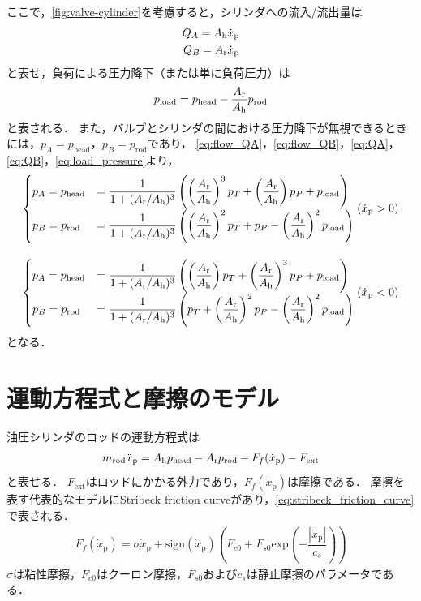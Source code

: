 ここで，\figname\ref{fig:valve-cylinder}を考慮すると，シリンダへの流入/流出量は
\begin{align}
    \label{eq:QA}
    Q_A = A_\mathrm{h} \dot{x}_\mathrm{p}\\
    \label{eq:QB}
    Q_B = A_\mathrm{r} \dot{x}_\mathrm{p}
\end{align}
と表せ，負荷による圧力降下（または単に負荷圧力）は
\begin{align}
    \label{eq:load_pressure}
    p_\mathrm{load} = p_\mathrm{head} - \frac{A_\mathrm{r}}{A_\mathrm{h}}p_\mathrm{rod}
\end{align}
と表される．
また，バルブとシリンダの間における圧力降下が無視できるときには，$p_A = p_\mathrm{head}$，$p_B = p_\mathrm{rod}$であり，
\eqnname\ref{eq:flow_QA}，\eqnname\ref{eq:flow_QB}，\eqnname\ref{eq:QA}，\eqnname\ref{eq:QB}，\eqnname\ref{eq:load_pressure}より，
\begin{align}
    \label{eq:papb-xp_plus}
    \begin{cases}
    p_A = p_\mathrm{head} &= \dfrac{1}{1+(A_\mathrm{r}/A_\mathrm{h})^3}\left( \left(\dfrac{A_\mathrm{r}}{A_\mathrm{h}}\right)^3p_T + \left(\dfrac{A_\mathrm{r}}{A_\mathrm{h}}\right)p_P  + p_\mathrm{load}\right) \\
    p_B = p_\mathrm{rod} &= \dfrac{1}{1+(A_\mathrm{r}/A_\mathrm{h})^3}\left( \left(\dfrac{A_\mathrm{r}}{A_\mathrm{h}}\right)^2p_T + p_P  - \left(\dfrac{A_\mathrm{r}}{A_\mathrm{h}}\right)^2p_\mathrm{load}\right)
    \end{cases}
    (\dot{x}_\mathrm{p} > 0)\\[10pt]
    \label{eq:papb-xp_minus}
    \begin{cases}
    p_A = p_\mathrm{head} &= \dfrac{1}{1+(A_\mathrm{r}/A_\mathrm{h})^3}\left( \left(\dfrac{A_\mathrm{r}}{A_\mathrm{h}}\right)p_T + \left(\dfrac{A_\mathrm{r}}{A_\mathrm{h}}\right)^3p_P  + p_\mathrm{load}\right) \\
    p_B = p_\mathrm{rod} &= \dfrac{1}{1+(A_\mathrm{r}/A_\mathrm{h})^3}\left( p_T + \left(\dfrac{A_\mathrm{r}}{A_\mathrm{h}}\right)^2p_P  - \left(\dfrac{A_\mathrm{r}}{A_\mathrm{h}}\right)^2p_\mathrm{load}\right)
    \end{cases}
    (\dot{x}_\mathrm{p} < 0)
\end{align}
となる．

\section{運動方程式と摩擦のモデル}
油圧シリンダのロッドの運動方程式は
\begin{align}
    \label{eq:eom_of_rod}
    m_\mathrm{rod}\ddot{x}_\mathrm{p} =A_\mathrm{h} p_\mathrm{head} - A_\mathrm{r} p_\mathrm{rod} - F_f(\dot{x}_\mathrm{p}) -F_\mathrm{ext}
\end{align}
と表せる．
$F_\mathrm{ext}$はロッドにかかる外力であり，$F_f(\dot{x}_\mathrm{p})$は摩擦である．
摩擦を表す代表的なモデルにStribeck friction curveがあり，\eqnname\ref{eq:stribeck_friction_curve}で表される．
\begin{align}
    \label{eq:stribeck_friction_curve}
    F_f(\dot{x}_\mathrm{p}) = \sigma \dot{x}_\mathrm{p} + \mathrm{sign}(\dot{x}_\mathrm{p}) \left( F_{c0} + F_{s0} \mathrm{exp}\left( -\dfrac{|\dot{x}_\mathrm{p}|}{c_s} \right) \right)
\end{align}
$\sigma$は粘性摩擦，$F_{c0}$はクーロン摩擦，$F_{s0}$および$c_s$は静止摩擦のパラメータである．


